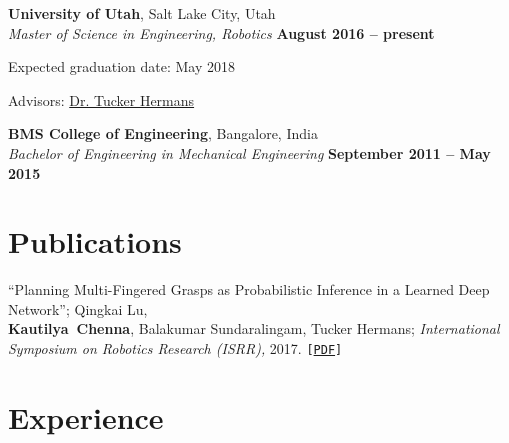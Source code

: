 \documentclass[letterpaper, margin, line]{resume}
\begin{document}
\begin{resume}
    \textbf{University of Utah}, Salt Lake City, Utah
    \vspace{2mm}\\\vspace{1mm}%
    \textsl{Master of Science in Engineering, Robotics} \hfill \textbf{ August 2016 -- present}\vspace{-3mm}\\\vspace{-1mm}%
    \begin{list2}
        \item Expected graduation date: May 2018
        \item Advisors:  \href{https://www.cs.utah.edu/~thermans/}{Dr. Tucker Hermans}
    \end{list2}\vspace{-1.5mm}
    \textbf{BMS College of Engineering}, Bangalore, India
    \vspace{2mm}\\\vspace{1mm}%
    \textsl{Bachelor of Engineering in Mechanical Engineering} \hfill \textbf{September 2011 -- May 2015}\vspace{-3mm}\\\vspace{-1mm}%


    \section{\mysidestyle Publications}
     ``Planning Multi-Fingered Grasps as Probabilistic Inference in a Learned Deep Network''; Qingkai Lu, \\
     \mbox{\bf Kautilya Chenna}, Balakumar Sundaralingam, Tucker Hermans; \textit{International Symposium on Robotics Research (ISRR),} 2017. \texttt{[\href{http://www.cs.utah.edu/~thermans/papers/lu-isrr2017-deep-multifinger-grasping.pdf}{PDF}]}

    \section{\mysidestyle Experience}


\end{resume}
\end{document}
